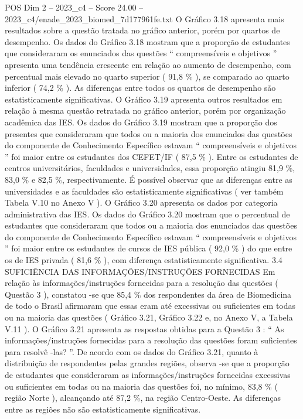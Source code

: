 \begin{textsample}{POS Dim 2 – 2023\_c4 – Score 24.00 – 2023\_c4/enade\_2023\_biomed\_7d177961fe.txt}
O Gráfico 3.18 apresenta mais resultados sobre a questão tratada no gráfico anterior, porém por quartos de desempenho.
Os dados do Gráfico 3.18 mostram que a proporção de estudantes que consideraram os enunciados das questões “ compreensíveis e objetivos ” apresenta uma tendência crescente em relação ao aumento de desempenho, com percentual mais elevado no quarto superior ( 91,8 \% ), se comparado ao quarto inferior ( 74,2 \% ).
As diferenças entre todos os quartos de desempenho são estatisticamente significativas.
O Gráfico 3.19 apresenta outros resultados em relação à mesma questão retratada no gráfico anterior, porém por organização acadêmica das IES.
Os dados do Gráfico 3.19 mostram que a proporção dos presentes que consideraram que todos ou a maioria dos enunciados das questões do componente de Conhecimento Específico estavam “ compreensíveis e objetivos ” foi maior entre os estudantes dos CEFET/IF ( 87,5 \% ).
Entre os estudantes de centros universitários, faculdades e universidades, essa proporção atingiu 81,9 \%, 83,0 \% e 82,5 \%, respectivamente.
É possível observar que as diferenças entre as universidades e as faculdades são estatisticamente significativas ( ver também Tabela V.10 no Anexo V ).
O Gráfico 3.20 apresenta os dados por categoria administrativa das IES.
Os dados do Gráfico 3.20 mostram que o percentual de estudantes que consideraram que todos ou a maioria dos enunciados das questões do componente de Conhecimento Específico estavam “ compreensíveis e objetivos ” foi maior entre os estudantes de cursos de IES pública ( 92,0 \% ) do que entre os de IES privada ( 81,6 \% ), com diferença estatisticamente significativa. 3.4 SUFICIÊNCIA DAS INFORMAÇÕES/INSTRUÇÕES FORNECIDAS Em relação às informações/instruções fornecidas para a resolução das questões ( Questão 3 ), constatou -se que 85,4 \% dos respondentes da área de Biomedicina de todo o Brasil afirmaram que essas eram até excessivas ou suficientes em todas ou na maioria das questões ( Gráfico 3.21, Gráfico 3.22 e, no Anexo V, a Tabela V.11 ).
O Gráfico 3.21 apresenta as respostas obtidas para a Questão 3 : “ As informações/instruções fornecidas para a resolução das questões foram suficientes para resolvê -las? ”.
De acordo com os dados do Gráfico 3.21, quanto à distribuição de respondentes pelas grandes regiões, observa -se que a proporção de estudantes que consideraram as informações/instruções fornecidas excessivas ou suficientes em todas ou na maioria das questões foi, no mínimo, 83,8 \% ( região Norte ), alcançando até 87,2 \%, na região Centro-Oeste.
As diferenças entre as regiões não são estatisticamente significativas.

\end{textsample}

